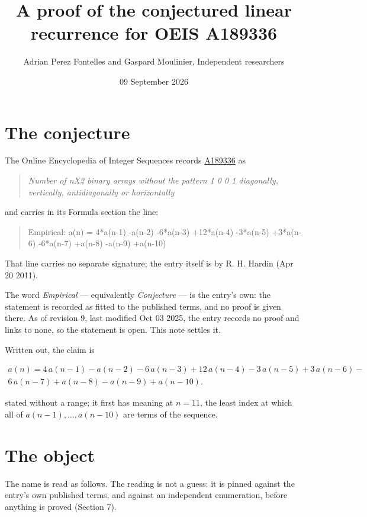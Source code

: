 \documentclass[11pt]{article}
\title{A proof of the conjectured linear recurrence for OEIS A189336}
\author{Adrian Perez Fontelles and Gaspard Moulinier, Independent researchers}
\date{09 September 2026}
\theoremstyle{definition}
\begin{document}
\maketitle
\section{The conjecture}

The Online Encyclopedia of Integer Sequences records \href{https://oeis.org/A189336}{A189336} as

\begin{quote}\itshape Number of nX2 binary arrays without the pattern 1 0 0 1 diagonally, vertically, antidiagonally or horizontally\end{quote}

and carries in its Formula section the line:

\begin{quote}\ttfamily Empirical: a(n) = 4*a(n-1) -a(n-2) -6*a(n-3) +12*a(n-4) -3*a(n-5) +3*a(n-6) -6*a(n-7) +a(n-8) -a(n-9) +a(n-10)\end{quote}

That line carries no separate signature; the entry itself is by R. H. Hardin (Apr 20 2011).

The word {\itshape Empirical} --- equivalently {\itshape Conjecture} --- is the entry's own: the statement is recorded as fitted to the published terms, and no proof is given there. As of revision 9, last modified Oct 03 2025, the entry records no proof and links to none, so the statement is open. This note settles it.

Written out, the claim is

\begin{multline*} a(n) = 4\,a(n-1) - a(n-2) - 6\,a(n-3) + 12\,a(n-4) - 3\,a(n-5) + 3\,a(n-6) - \\ 6\,a(n-7) + a(n-8) - a(n-9) + a(n-10). \end{multline*}

stated without a range; it first has meaning at $n = 11$, the least index at which all of $a(n-1),\dots,a(n-10)$ are terms of the sequence.

\section{The object}

The name is read as follows. The reading is not a guess: it is pinned against the entry's own published terms, and against an independent enumeration, before anything is proved (Section 7).
\end{document}

